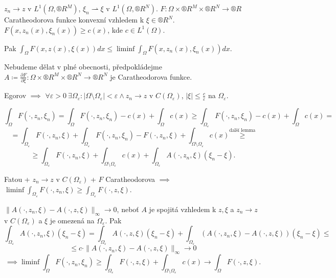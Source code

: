 \documentclass[12pt]{article}					%
\begin{document}
\begin{lemma}
	$z_n \rightarrow z$ v $L^1(Ω, ®R^M)$, $ξ_n \rightharpoonup ξ$ v $L^1(Ω, ®R^N)$. $F: Ω \times ®R^M \times ®R^N \rightarrow ®R$ Caratheodorova funkce konvexní vzhledem k $ξ \in ®R^N$. $F(x, z_n(x), ξ_n(x)) ≥ c(x)$, kde $c \in L^1(Ω)$.

	Pak $\int_Ω F(x, z(x), ξ(x)) dx ≤ \liminf \int_Ω F(x, z_n(x), ξ_n(x)) dx$.

	\begin{dukazin}
		Nebudeme dělat v plné obecnosti, předpokládejme $A \coloneq \frac{\partial F}{\partial ξ}: Ω \times ®R^M \times ®R^N \rightarrow ®R^N$ je Caratheodorova funkce.

		Egorov $\implies$ $\forall ε > 0\ \exists Ω_ε: |Ω \setminus Ω_ε| < ε \land z_n \rightarrow z$ v $C(Ω_ε)$, $|ξ| ≤ \frac{c}{ε}$ na $Ω_ε$.

		$$ \int_Ω F(·, z_n, ξ_n) = \int_Ω F(·, z_n, ξ_n) - c(x) + \int_Ω c(x) ≥ \int_{Ω_ε} F(·, z_n, ξ_n) - c(x) + \int_Ω c(x) = $$
		$$ = \int_{Ω_ε} F(·, z_n, ξ) + \int_{Ω_ε} F(·, z_n, ξ_n) - F(·, z_n, ξ) + \int_{Ω \setminus Ω_ε} c(x) \overset{\text{další lemma}}≥ $$
		$$ ≥ \int_{Ω_ε} F(·, z_n, ξ) + \int_{Ω \setminus Ω_ε} c(x) + \int_{Ω_ε} A(·, z_n, ξ)(ξ_n - ξ). $$

		Fatou + $z_n \rightarrow z$ v $C(Ω_ε)$ + $F$ Caratheodorova $\implies$ $\liminf \int_{Ω_ε} \! F(·, z_n, ξ) ≥ \int_{Ω_ε} \! F(·, z, ξ)$.

		$\|A(·, z_n, ξ) - A(·, z, ξ)\|_∞ \rightarrow 0$, neboť $A$ je spojitá vzhledem k $z, ξ$ a $z_n \rightarrow z$ v $C(Ω_ε)$ a $ξ$ je omezená na $Ω_ε$. Pak
		$$ \int_{Ω_ε} A(·, z_n, ξ)(ξ_n - ξ) = \int_{Ω_ε} A(·, z, ξ)(ξ_n - ξ) + \int_{Ω_ε}(A(·, z_n, ξ) - A(·, z, ξ))(ξ_n - ξ) ≤ $$
		$$ ≤ c·\|A(·, z_n, ξ) - A(·, z, ξ)\|_∞ \rightarrow 0 $$
		$$ \implies \liminf \int_Ω F(·, z_n, ξ_n) ≥ \int_{Ω_ε} F(·, z, ξ) + \int_{Ω \setminus Ω_ε} c(x) \rightarrow \int_Ω F(·, z, ξ). $$
	\end{dukazin}
\end{lemma}
\end{document}
